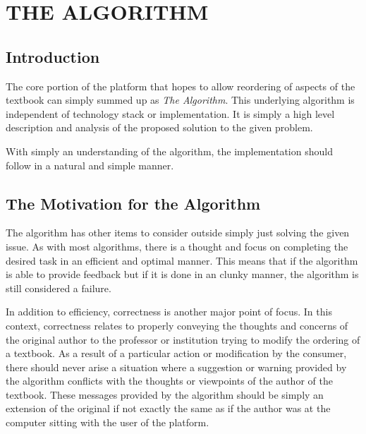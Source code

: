 %
%
%
%

\chapter{THE ALGORITHM}


\section{Introduction}

The core portion of the platform that hopes to allow reordering of aspects of the textbook can simply summed up as \textit{The Algorithm}. This underlying algorithm is independent of technology stack or implementation. It is simply a high level description and analysis of the proposed solution to the given problem.

With simply an understanding of the algorithm, the implementation should follow in a natural and simple manner.

\section{The Motivation for the Algorithm}

The algorithm has other items to consider outside simply just solving the given issue. As with most algorithms, there is a thought and focus on completing the desired task in an efficient and optimal manner. This means that if the algorithm is able to provide feedback but if it is done in an clunky manner, the algorithm is still considered a failure.

In addition to efficiency, correctness is another major point of focus. In this context, correctness relates to properly conveying the thoughts and concerns of the original author to the professor or institution trying to modify the ordering of a textbook. As a result of a particular action or modification by the consumer, there should never arise a situation where a suggestion or warning provided by the algorithm conflicts with the thoughts or viewpoints of the author of the textbook. These messages provided by the algorithm should be simply an extension of the original if not exactly the same as if the author was at the computer sitting with the user of the platform.


